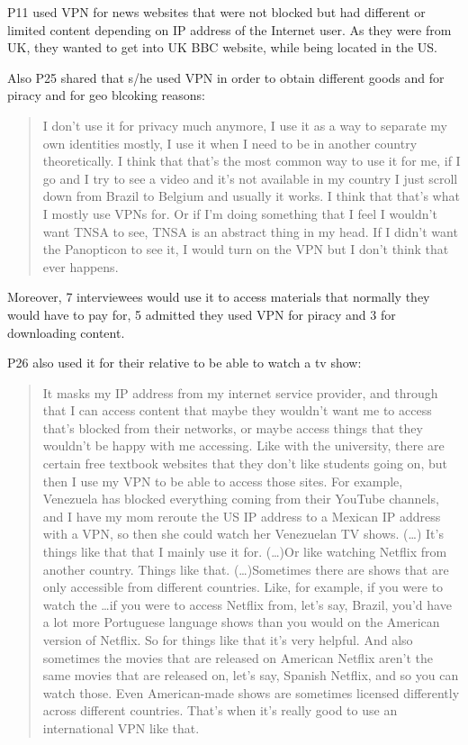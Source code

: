 P11 used VPN for news websites that were not blocked but had different or limited content depending on IP address of the Internet user. As they were from UK, they wanted to get into UK BBC website, while being located in the US.

Also P25 shared that s/he used VPN in order to obtain different goods and for piracy and for geo blcoking reasons:
\begin{quote}I don't use it for privacy much anymore, I use it as a way to separate my own identities mostly, I use it when I need to be in another country theoretically. I think that that's the most common way to use it for me, if I go and I try to see a video and it's not available in my country I just scroll down from Brazil to Belgium and usually it works. I think that that's what I mostly use VPNs for. Or if I'm doing something that I feel I wouldn't want TNSA to see, TNSA is an abstract thing in my head. If I didn't want the Panopticon to see it, I would turn on the VPN but I don't think that ever happens.\end{quote}

Moreover, 7 interviewees would use it to access materials that normally they would have to pay for, 5 admitted they used VPN for piracy and 3 for downloading content.

P26 also used it for their relative to be able to watch a tv show:
\begin{quote}It masks my IP address from my internet service provider, and through that I can access content that maybe they wouldn't want me to access that's blocked from their networks, or maybe access things that they wouldn't be happy with me accessing. Like with the university, there are certain free textbook websites that they don't like students going on, but then I use my VPN to be able to access those sites. For example, Venezuela has blocked everything coming from their YouTube channels, and I have my mom reroute the US IP address to a Mexican IP address with a VPN, so then she could watch her Venezuelan TV shows. (\dots) It's things like that that I mainly use it for.
(\dots)Or like watching Netflix from another country. Things like that. (\dots)Sometimes there are shows that are only accessible from different countries. Like, for example, if you were to watch the \dots if you were to access Netflix from, let's say, Brazil, you'd have a lot more Portuguese language shows than you would on the American version of Netflix. So for things like that it's very helpful. And also sometimes the movies that are released on American Netflix aren't the same movies that are released on, let's say, Spanish Netflix, and so you can watch those. Even American-made shows are sometimes licensed differently across different countries. That's when it's really good to use an international VPN like that.\end{quote}

